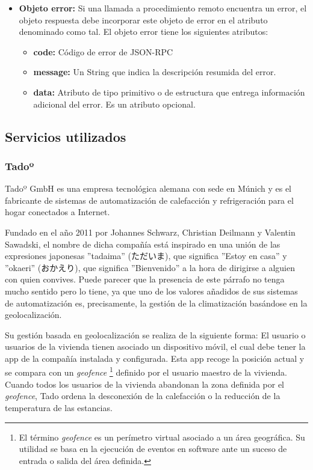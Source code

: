 \documentclass[spanish,12pt, a4paper, twoside]{paper}
\begin{document}
\begin{itemize}
\item \textbf{Objeto error:} Si una llamada a procedimiento remoto encuentra un error, el objeto respuesta debe incorporar este objeto de error en el atributo denominado como tal. El objeto error tiene los siguientes atributos:

\begin{itemize}
\item \textbf{code:} Código de error de JSON-RPC

\item \textbf{message:} Un String que indica la descripción resumida del error.

\item \textbf{data:} Atributo de tipo primitivo o de estructura que entrega información adicional del error. Es un atributo opcional.
\end{itemize}

\end{itemize}

\subsection{Servicios utilizados}

\subsubsection{Tadoº}

Tadoº GmbH es una empresa tecnológica alemana con sede en Múnich y es el fabricante de sistemas de automatización de calefacción y refrigeración para el hogar conectados a Internet.
\newline

Fundado en el año 2011 por Johannes Schwarz, Christian Deilmann y Valentin Sawadski, el nombre de dicha compañía está inspirado en una unión de las expresiones japonesas ''tadaima'' (ただいま), que significa ''Estoy en casa'' y ''okaeri'' (おかえり), que significa ''Bienvenido'' a la hora de dirigirse a alguien con quien convives. Puede parecer que la presencia de este párrafo no tenga mucho sentido pero lo tiene, ya que uno de los valores añadidos de sus sistemas de automatización es, precisamente, la gestión de la climatización basándose en la geolocalización.
\newline

Su gestión basada en geolocalización se realiza de la siguiente forma: El usuario o usuarios de la vivienda tienen asociado un dispositivo móvil, el cual debe tener la app de la compañía instalada y configurada. Esta app recoge la posición actual y se compara con un \emph{geofence} \footnote{El término \emph{geofence} es un perímetro virtual asociado a un área geográfica. Su utilidad se basa en la ejecución de eventos en software ante un suceso de entrada o salida del área definida. } definido por el usuario maestro de la vivienda. Cuando todos los usuarios de la vivienda abandonan la zona definida por el \emph{geofence}, Tado ordena la desconexión de la calefacción o la reducción de la temperatura de las estancias.
\newline
\end{document}
